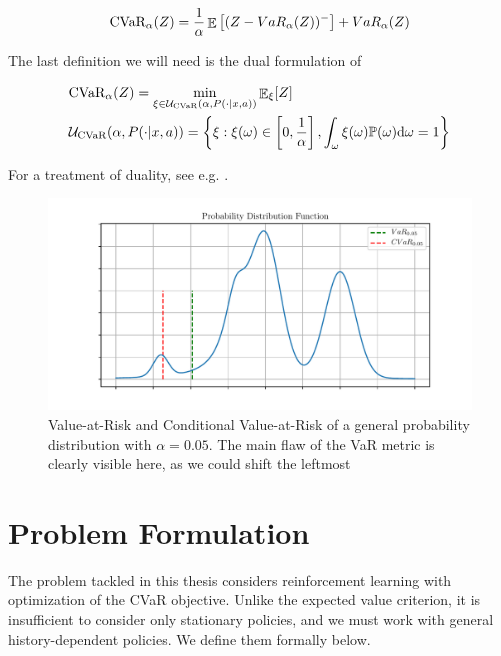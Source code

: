\begin{equation}
\text{CVaR}_\alpha(Z)= \dfrac{1}{\alpha}\mathop{\mathbb{E}} \left[ (Z-VaR_\alpha(Z))^-\right] + VaR_\alpha(Z)
\end{equation}

The last definition we will need is the dual formulation of 

\begin{align}\label{eqn:prelim:cvardual}
&\text{CVaR}_\alpha(Z)= \min_{\xi \in \mathcal{U}_{\text{CVaR}}(\alpha, P(\cdot | x, a))}\mathop{\mathbb{E}}\nolimits_\xi[Z]\\
&\mathcal{U}_{\text{CVaR}}(\alpha, P(\cdot | x, a)) = \left\{ {\xi : \xi(\omega) \in \left[ {0, \frac{1}{\alpha}} \right], \int_{\omega} \xi(\omega)\mathbb{P}(\omega) \text{d}\omega = 1} \right\}
\end{align}


For a treatment of duality, see e.g. \citet{boyd2004convex}.

\begin{figure}
\center
\includegraphics[width=\linewidth]{gfx/pdf.pdf}
\caption{Value-at-Risk and Conditional Value-at-Risk of a general probability distribution with $\alpha=0.05$. The main flaw of the VaR metric is clearly visible here, as we could shift the leftmost }
\end{figure}





\section{Problem Formulation}\label{sec:prelim:problem}

The problem tackled in this thesis considers reinforcement learning with optimization of the CVaR objective. Unlike the expected value criterion, it is insufficient to consider only stationary policies, and we must work with general history-dependent policies. We define them formally below.


